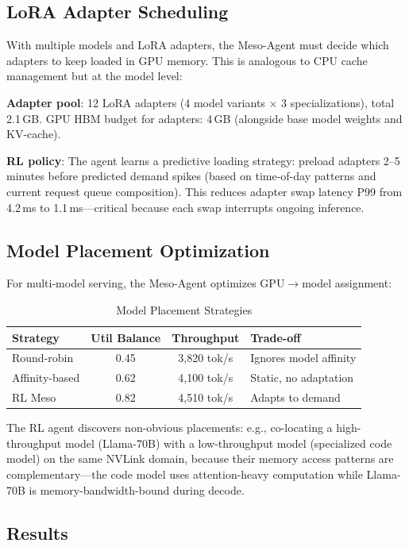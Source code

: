 \documentclass[conference,10pt]{IEEEtran}
\begin{document}
\subsection{LoRA Adapter Scheduling}

With multiple models and LoRA adapters, the Meso-Agent must decide which adapters to keep loaded in GPU memory. This is analogous to CPU cache management but at the model level:

\textbf{Adapter pool}: 12 LoRA adapters (4 model variants $\times$ 3 specializations), total 2.1\,GB. GPU HBM budget for adapters: 4\,GB (alongside base model weights and KV-cache).

\textbf{RL policy}: The agent learns a predictive loading strategy: preload adapters 2--5 minutes before predicted demand spikes (based on time-of-day patterns and current request queue composition). This reduces adapter swap latency P99 from 4.2\,ms to 1.1\,ms---critical because each swap interrupts ongoing inference.

\subsection{Model Placement Optimization}

For multi-model serving, the Meso-Agent optimizes GPU$\to$model assignment:

\begin{table}[!htbp]
\caption{Model Placement Strategies}
\label{tab:placement}
\centering\scriptsize
\begin{tabular}{@{}lccl@{}}
\toprule
\textbf{Strategy} & \textbf{Util Balance} & \textbf{Throughput} & \textbf{Trade-off} \\
\midrule
Round-robin & 0.45 & 3,820 tok/s & Ignores model affinity \\
Affinity-based & 0.62 & 4,100 tok/s & Static, no adaptation \\
RL Meso & 0.82 & 4,510 tok/s & Adapts to demand \\
\bottomrule
\end{tabular}
\end{table}

The RL agent discovers non-obvious placements: e.g., co-locating a high-throughput model (Llama-70B) with a low-throughput model (specialized code model) on the same NVLink domain, because their memory access patterns are complementary---the code model uses attention-heavy computation while Llama-70B is memory-bandwidth-bound during decode.

\subsection{Results}
\end{document}
